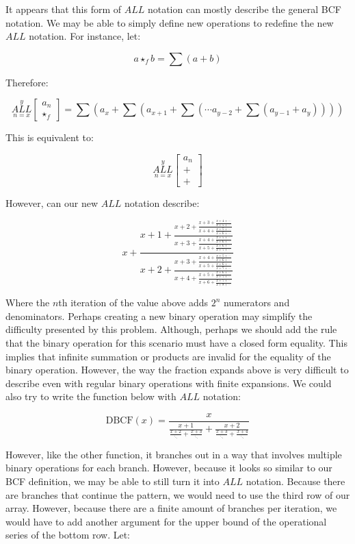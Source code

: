 \documentclass{article}
\begin{document}
It appears that this form of $ALL$ notation can mostly describe the general BCF notation. We may be able to simply define new operations to redefine the new $ALL$ notation. For instance, let:

$$a \star_f b = \sum (a+b)$$

Therefore:

$$\underset{n=x}{\overset{y}{ALL}}
\begin{bmatrix}
a_n \\ \star_f \end{bmatrix} = \sum (a_x+\sum(a_{x+1}+\sum(\cdots a_{y-2} + \sum(a_{y-1} +a_y))))$$

This is equivalent to:

$$\underset{n=x}{\overset{y}{ALL}}
\begin{bmatrix}
a_n \\ + \\ + \end{bmatrix}$$

However, can our new $ALL$ notation describe:

$$x+\frac{x+1+\frac{x+2+\frac{x+3+\frac{x+4+\cdots}{x+5+\cdots}}{x+4+\frac{x+5+\cdots}{x+6+\cdots}}}{x+3+\frac{x+4+\frac{x+5+\cdots}{x+6+\cdots}}{x+5+\frac{x+6+\cdots}{x+7+\cdots}}}}{x+2+\frac{x+3+\frac{x+4+\frac{x+5+\cdots}{x+6+\cdots}}{x+5+\frac{x+6+\cdots}{x+7+\cdots}}}{x+4+\frac{x+5+\frac{x+6+\cdots}{x+7+\cdots}}{x+6+\frac{x+7+\cdots}{x+8+\cdots}}}}$$

Where the $n$th iteration of the value above adds $2^n$ numerators and denominators. Perhaps creating a new binary operation may simplify the difficulty presented by this problem. Although, perhaps we should add the rule that the binary operation for this scenario must have a closed form equality. This implies that infinite summation or products are invalid for the equality of the binary operation. However, the way the fraction expands above is very difficult to describe even with regular binary operations with finite expansions. We could also try to write the function below with $ALL$ notation:

$$\text{DBCF}(x)=\frac{x}{\frac{x+1}{\frac{x+2}{\ddots}+\frac{x+3}{\ddots}}+\frac{x+2}{\frac{x+3}{\ddots}+\frac{x+4}{\ddots}}}$$

However, like the other function, it branches out in a way that involves multiple binary operations for each branch. However, because it looks so similar to our BCF definition, we may be able to still turn it into $ALL$ notation. Because there are branches that continue the pattern, we would need to use the third row of our array. However, because there are a finite amount of branches per iteration, we would have to add another argument for the upper bound of the operational series of the bottom row. Let:
\end{document}
